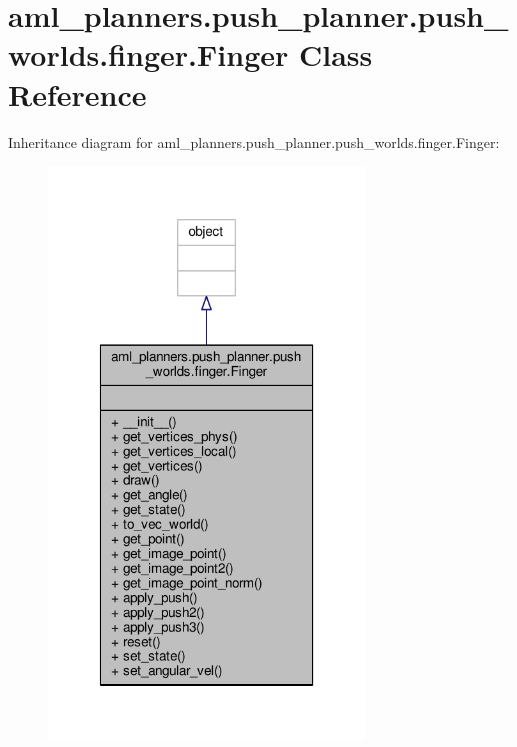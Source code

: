 \hypertarget{classaml__planners_1_1push__planner_1_1push__worlds_1_1finger_1_1_finger}{\section{aml\-\_\-planners.\-push\-\_\-planner.\-push\-\_\-worlds.\-finger.\-Finger Class Reference}
\label{classaml__planners_1_1push__planner_1_1push__worlds_1_1finger_1_1_finger}
}


Inheritance diagram for aml\-\_\-planners.\-push\-\_\-planner.\-push\-\_\-worlds.\-finger.\-Finger\-:\nopagebreak
\begin{figure}[H]
\begin{center}
\leavevmode
\includegraphics[width=238pt]{classaml__planners_1_1push__planner_1_1push__worlds_1_1finger_1_1_finger__inherit__graph}
\end{center}
\end{figure}


